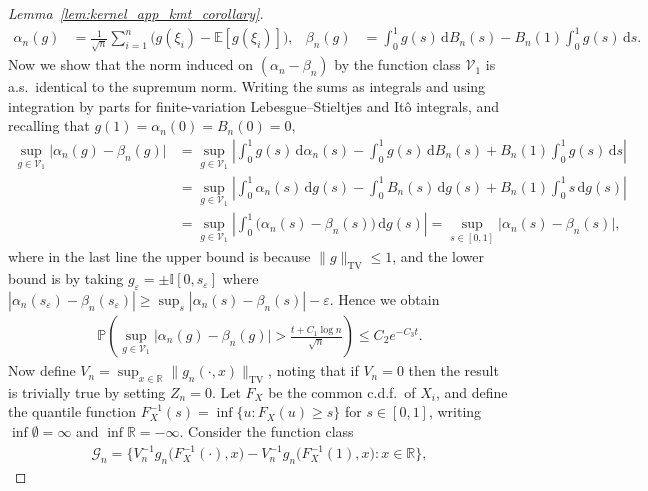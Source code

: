 \documentclass[11pt,lof]{puthesis}
\renewcommand{\P}{\ensuremath{\mathbb{P}}}
\newcommand{\R}{\ensuremath{\mathbb{R}}}
\newcommand{\E}{\ensuremath{\mathbb{E}}}
\newcommand{\I}{\ensuremath{\mathbb{I}}}
\newcommand{\TV}{\mathrm{TV}}
\newcommand{\cG}{\ensuremath{\mathcal{G}}}
\newcommand{\cV}{\ensuremath{\mathcal{V}}}
\newcommand{\diff}[1]{\,\mathrm{d}#1}
\theoremstyle{break}
\theoremstyle{proof}
\newtheorem{proof}{Proof}
\begin{document}
\begin{proof}[Lemma~\ref{lem:kernel_app_kmt_corollary}]
  \begin{align*}
    \alpha_n(g)
    &=
    \frac{1}{\sqrt{n}}
    \sum_{i=1}^n
    \big( g(\xi_i) - \E[g(\xi_i)]),
    &\beta_n(g)
    &= \int_0^1 g(s) \diff{B_n(s)}
    - B_n(1) \int_0^1 g(s) \diff{s}.
  \end{align*}
  Now we show that the norm induced on
  $(\alpha_n - \beta_n)$
  by the function class $\cV_1$ is a.s.\ identical to the
  supremum norm.
  Writing the sums as integrals and using integration by parts
  for finite-variation Lebesgue--Stieltjes and It\^o integrals,
  and recalling that $g(1) = \alpha_n(0) = B_n(0) = 0$,
  \begin{align*}
    \sup_{g \in \cV_1}
    \big|\alpha_n(g) - \beta_n(g)\big|
    &=
    \sup_{g \in \cV_1}
    \left|
    \int_0^1 g(s) \diff{\alpha_n(s)}
    - \int_0^1 g(s) \diff{B_n(s)}
    + B_n(1) \int_0^1 g(s) \diff{s}
    \right| \\
    &=
    \sup_{g \in \cV_1}
    \left|
    \int_0^1 \alpha_n(s) \diff{g(s)}
    - \int_0^1 B_n(s) \diff{g(s)}
    + B_n(1) \int_0^1 s \diff{g(s)}
    \right| \\
    &=
    \sup_{g \in \cV_1}
    \left|
    \int_0^1 \big(\alpha_n(s) - \beta_n(s)\big)
    \diff{g(s)}
    \right|
    = \sup_{s \in [0,1]}
    \big|
    \alpha_n(s) - \beta_n(s)
    \big|,
  \end{align*}
  where in the last line
  the upper bound is because $\|g\|_\TV \leq 1$,
  and the lower bound is by taking
  $g_\varepsilon = \pm \I[0,s_\varepsilon]$ where
  $|\alpha_n(s_\varepsilon) - \beta_n(s_\varepsilon)|
  \geq \sup_s |\alpha_n(s) - \beta_n(s)| -
  \varepsilon$.
  Hence we obtain
  \begin{align}
    \label{eq:kernel_app_kmt_concentration}
    \P\left(
      \sup_{g \in \cV_1}
      \big|\alpha_n(g) - \beta_n(g)\big|
      > \frac{t + C_1\log n}{\sqrt{n}}
    \right)
    \leq C_2 e^{-C_3 t}.
  \end{align}
  Now define $V_n = \sup_{x \in \R} \|g_n(\cdot, x)\|_\TV$,
  noting that if $V_n = 0$ then the result is trivially true
  by setting $Z_n = 0$.
  Let $F_X$ be the common c.d.f.\ of $X_i$,
  and define the quantile function
  $F_X^{-1}(s) = \inf \{u: F_X(u) \geq s\}$ for $s \in [0,1]$,
  writing $\inf \emptyset = \infty$
  and $\inf \R = -\infty$.
  Consider the function class
  \begin{align*}
    \cG_n = \big\{
      V_n^{-1} g_n\big(F_X^{-1}(\cdot), x\big)
      - V_n^{-1} g_n\big(F_X^{-1}(1), x\big)
    : x \in \R \big\},
  \end{align*}

\end{proof}
\end{document}
